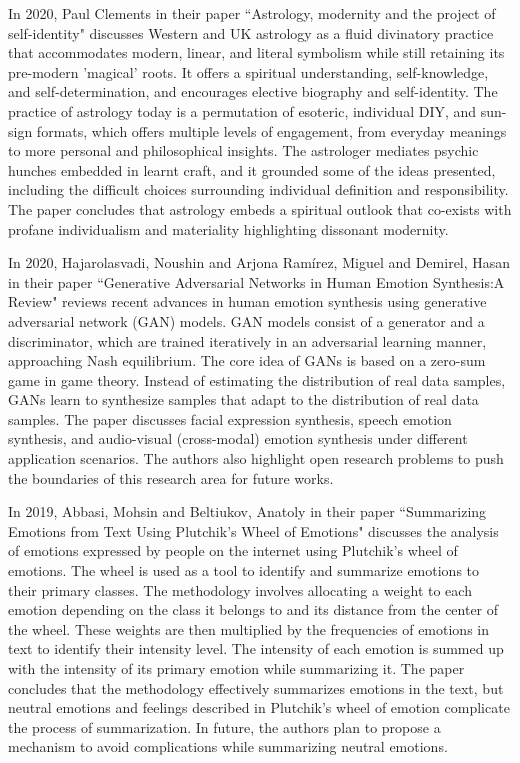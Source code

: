 In 2020, Paul Clements in their paper ``Astrology, modernity and the project of self-identity" discusses Western and UK astrology as a fluid divinatory practice that accommodates modern, linear, and literal symbolism while still retaining its pre-modern 'magical' roots. It offers a spiritual understanding, self-knowledge, and self-determination, and encourages elective biography and self-identity. The practice of astrology today is a permutation of esoteric, individual DIY, and sun-sign formats, which offers multiple levels of engagement, from everyday meanings to more personal and philosophical insights. The astrologer mediates psychic hunches embedded in learnt craft, and it grounded some of the ideas presented, including the difficult choices surrounding individual definition and responsibility. The paper concludes that astrology embeds a spiritual outlook that co-exists with profane individualism and materiality highlighting dissonant modernity\cite{doi:10.1080/14755610.2022.2093234}.

In 2020, Hajarolasvadi, Noushin and Arjona Ramírez, Miguel and Demirel, Hasan in their paper ``Generative Adversarial Networks in Human Emotion Synthesis:A Review" reviews recent advances in human emotion synthesis using generative adversarial network (GAN) models. GAN models consist of a generator and a discriminator, which are trained iteratively in an adversarial learning manner, approaching Nash equilibrium. The core idea of GANs is based on a zero-sum game in game theory. Instead of estimating the distribution of real data samples, GANs learn to synthesize samples that adapt to the distribution of real data samples. The paper discusses facial expression synthesis, speech emotion synthesis, and audio-visual (cross-modal) emotion synthesis under different application scenarios. The authors also highlight open research problems to push the boundaries of this research area for future works\cite{article0}.

In 2019, Abbasi, Mohsin and Beltiukov, Anatoly in their paper ``Summarizing Emotions from Text Using Plutchik's Wheel of Emotions" discusses the analysis of emotions expressed by people on the internet using Plutchik's wheel of emotions. The wheel is used as a tool to identify and summarize emotions to their primary classes. The methodology involves allocating a weight to each emotion depending on the class it belongs to and its distance from the center of the wheel. These weights are then multiplied by the frequencies of emotions in text to identify their intensity level. The intensity of each emotion is summed up with the intensity of its primary emotion while summarizing it. The paper concludes that the methodology effectively summarizes emotions in the text, but neutral emotions and feelings described in Plutchik's wheel of emotion complicate the process of summarization. In future, the authors plan to propose a mechanism to avoid complications while summarizing neutral emotions\cite{article3}.

